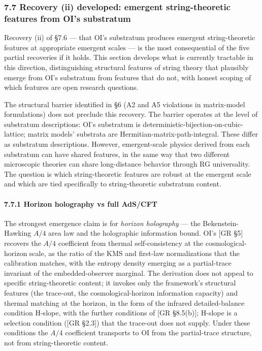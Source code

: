 \documentclass[
]{article}
\begin{document}
\hypertarget{recovery-ii-developed-emergent-string-theoretic-features-from-ois-substratum}{%
\subsubsection{7.7 Recovery (ii) developed: emergent string-theoretic
features from OI's
substratum}\label{recovery-ii-developed-emergent-string-theoretic-features-from-ois-substratum}}

Recovery (ii) of §7.6 --- that OI's substratum produces emergent
string-theoretic features at appropriate emergent scales --- is the most
consequential of the five partial recoveries if it holds. This section
develops what is currently tractable in this direction, distinguishing
structural features of string theory that plausibly emerge from OI's
substratum from features that do not, with honest scoping of which
features are open research questions.

The structural barrier identified in §6 (A2 and A5 violations in
matrix-model formulations) does not preclude this recovery. The barrier
operates at the level of substratum descriptions: OI's substratum is
deterministic-bijection-on-cubic-lattice; matrix models' substrata are
Hermitian-matrix-path-integral. These differ as substratum descriptions.
However, emergent-scale physics derived from each substratum can have
shared features, in the same way that two different microscopic theories
can share long-distance behavior through RG universality. The question
is which string-theoretic features are robust at the emergent scale and
which are tied specifically to string-theoretic substratum content.

\hypertarget{horizon-holography-vs-full-adscft}{%
\paragraph{7.7.1 Horizon holography vs full
AdS/CFT}\label{horizon-holography-vs-full-adscft}}

The strongest emergence claim is for \emph{horizon holography} --- the
Bekenstein-Hawking \(A/4\) area law and the holographic information
bound. OI's {[}GR §5{]} recovers the \(A/4\) coefficient from thermal
self-consistency at the cosmological-horizon scale, as the ratio of the
KMS and first-law normalizations that the calibration matches, with the
entropy density emerging as a partial-trace invariant of the
embedded-observer marginal. The derivation does not appeal to specific
string-theoretic content; it invokes only the framework's structural
features (the trace-out, the cosmological-horizon information capacity)
and thermal matching at the horizon, in the form of the infrared
detailed-balance condition H-slope, with the further conditions of {[}GR
§8.5(b){]}; H-slope is a selection condition ({[}GR §2.3{]}) that the
trace-out does not supply. Under these conditions the \(A/4\)
coefficient transports to OI from the partial-trace structure, not from
string-theoretic content.
\end{document}
